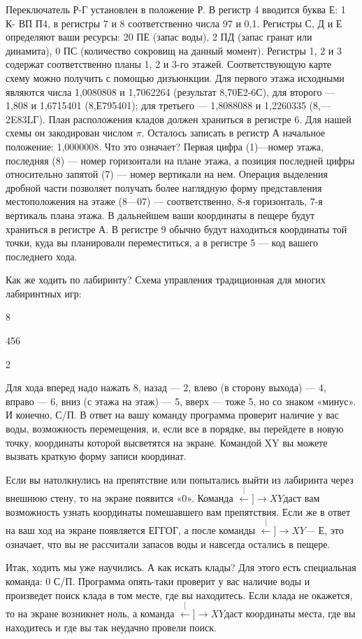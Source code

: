 \documentclass[11pt,a4paper,oneside]{article}
\def\XY{$\stackrel[\leftarrow]{\rightarrow}{XY}$}
\begin{document}
Переключатель Р-Г установлен в положение Р. В регистр 4 вводится буква Е: 1 К- ВП П4, в регистры 7 и 8 соответственно числа 97 и 0,1. Регистры С, Д и Е определяют ваши ресурсы: 20 ПЕ (запас воды), 2 ПД (запас гранат или динамита), 0 ПС (количество сокровищ на данный момент). Регистры 1, 2 и 3 содержат соответственно планы 1, 2 и 3-го этажей. Соответствующую карте схему можно получить с помощью дизъюнкции. Для первого этажа исходными являются числа 1,0080808 и 1,7062264 (результат 8,70Е2-6С), для второго — 1,808 и 1,6715401
(8,Е795401); для третьего — 1,8088088 и 1,2260335 (8,—2E83LГ). План расположения кладов должен храниться в регистре 6. Для нашей схемы он закодирован числом $\pi$. Осталось записать в регистр А начальное положение: 1,0000008. Что это означает? Первая цифра (1)—номер этажа, последняя (8) — номер горизонтали на плане этажа, а позиция последней цифры относительно запятой (7) — номер вертикали на нем. Операция выделения дробной части позволяет получать более наглядную форму представления местоположения на этаже (8—07) — соответственно, 8-я горизонталь, 7-я вертикаль плана этажа. В дальнейшем ваши координаты в пещере будут храниться в регистре А. В регистре 9 обычно будут находиться координаты той точки, куда вы планировали переместиться, а в регистре 5 — код вашего последнего хода.

Как же ходить по лабиринту? Схема управления традиционная для многих лабиринтных игр:

8

456

2

Для хода вперед надо нажать 8, назад — 2, влево (в сторону выхода) — 4, вправо — 6, вниз (с этажа на этаж) — 5, вверх — тоже 5, но со знаком «минус». И конечно, С/П. В ответ на вашу команду программа проверит наличие у вас воды, возможность перемещения, и, если все в порядке, вы перейдете в новую точку, координаты которой высветятся на экране. Командой XY вы можете вызвать краткую форму записи координат.

Если вы натолкнулись на препятствие или попытались выйти из лабиринта через внешнюю стену, то на экране появится «0». Команда \XY даст вам возможность узнать координаты помешавшего вам препятствия. Если же в ответ на ваш ход на экране появляется ЕГГОГ, а после команды \XY — Е, это означает, что вы не рассчитали запасов воды и навсегда остались в пещере.

Итак, ходить мы уже научились. А как искать клады? Для этого есть специальная команда: 0 С/П. Программа опять-таки проверит у вас наличие воды и произведет поиск клада в том месте, где вы находитесь. Если клада не окажется, то на экране возникнет ноль, а команда \XY даст координаты места, где вы находитесь и где вы так неудачно провели поиск.
\end{document}
